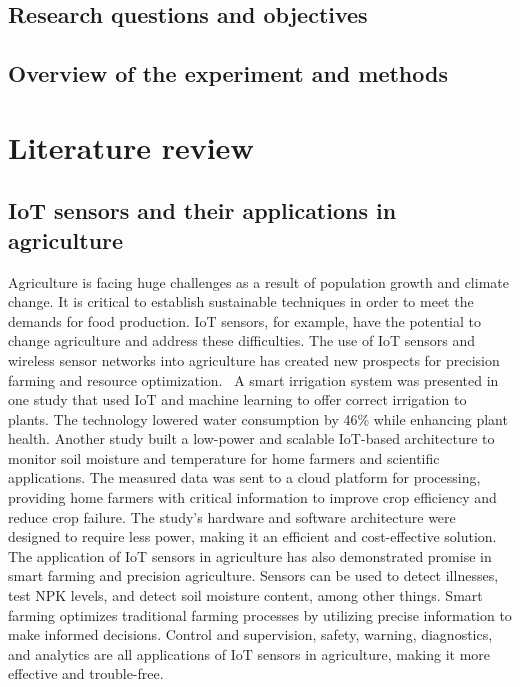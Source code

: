 \documentclass[11pt]{scrartcl} %
\begin{document}
\subsection{Research questions and objectives}
\subsection{Overview of the experiment and methods}

\section{Literature review}
\subsection{IoT sensors and their applications in agriculture}
Agriculture is facing huge challenges as a result of population growth and climate change. It is critical to establish sustainable techniques in order to meet the demands for food production. IoT sensors, for example, have the potential to change agriculture and address these difficulties. The use of IoT sensors and wireless sensor networks into agriculture has created new prospects for precision farming and resource optimization.~\parencite{capacitive_sensors_for_irrigation_and_disease}
\newline A smart irrigation system was presented in one study that used IoT and machine learning to offer correct irrigation to plants. The technology lowered water consumption by 46\% while enhancing plant health. Another study built a low-power and scalable IoT-based architecture to monitor soil moisture and temperature for home farmers and scientific applications. The measured data was sent to a cloud platform for processing, providing home farmers with critical information to improve crop efficiency and reduce crop failure. The study's hardware and software architecture were designed to require less power, making it an efficient and cost-effective solution.~\parencites{precision_irrigation_iot}{capacitive_sensors_for_irrigation_and_disease}
\newline The application of IoT sensors in agriculture has also demonstrated promise in smart farming and precision agriculture. Sensors can be used to detect illnesses, test NPK levels, and detect soil moisture content, among other things. Smart farming optimizes traditional farming processes by utilizing precise information to make informed decisions. Control and supervision, safety, warning, diagnostics, and analytics are all applications of IoT sensors in agriculture, making it more effective and trouble-free.~\parencite{iot_and_sensors_in_agriculture_general}
\end{document}
